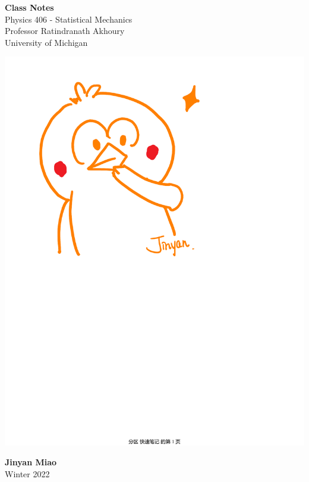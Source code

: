 \documentclass[11pt,oneside]{book}
\theoremstyle{break}
\theoremstyle{break}
\begin{document}
	\begin{titlepage}
		\begin{center}
			\vspace*{\fill}
			\Huge \color{red}
				\textbf{Class Notes}\\
			\vspace{0.5cm}			
			\Large \color{black}
				Physics 406 - Statistical Mechanics\\	
				Professor Ratindranath Akhoury\\
				University of Michigan\\
			\vspace{3cm}
			
			\begin{center}
			\includegraphics[scale=0.66]{hmm.pdf}
			\end{center}

			
			\vspace{5cm}
			\LARGE
				\textbf{Jinyan Miao}\\
				Winter 2022\\
			\vspace{5cm}

		\vspace*{\fill}
		\end{center}			
	\end{titlepage}
\end{document}
